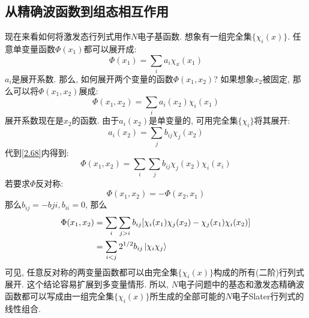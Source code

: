 \subsection{从精确波函数到组态相互作用}
 \label{sec2.2.7}
现在来看如何将激发态行列式用作$N$电子基函数. 想象有一组完全集$\{\chi_i(x)\}$. 任意单变量函数$\Phi(x_1)$都可以展开成:
\begin{equation}
	\Phi(x_1)=\sum_ia_i\chi_x(x_1)
\end{equation}
$a_i$是展开系数. 那么, 如何展开两个变量的函数$\Phi(x_1,x_2)$? 如果想象$x_2$被固定, 那么可以将$\Phi(x_1,x_2)$展成:
\begin{equation}
\label{2.68}
\Phi(x_1,x_2)=\sum_ia_i(x_2)\chi_i(x_1)
\end{equation}
展开系数现在是$x_2$的函数. 由于$a_i(x_2)$是单变量的, 可用完全集$\{\chi_i \}$将其展开:
\begin{equation}
a_i(x_2)=\sum_jb_{ij}\chi_j(x_2)
\end{equation}
代到\ref{2.68}内得到:
\begin{equation}
\Phi(x_1,x_2)=\sum_i\sum_jb_{ij}\chi_j(x_2)\chi_i(x_i)
\end{equation}
若要求$\Phi$反对称:
\begin{equation}
\Phi(x_1,x_2)=-\Phi(x_2,x_1)
\end{equation}
那么$b_{ij}=-b{ji},b_{ii}=0$, 那么
\begin{equation}
\begin{split}
\Phi(x_1,x_2)&=\sum_i\sum_{j>i}b_{ij}[\chi_i(x_1)\chi_j(x_2)-\chi_j(x_1)\chi_i(x_2)]\\
&=\sum_{i<j}2^{1/2}b_{ij}\Ket{\chi_i\chi_j}
\end{split}
\end{equation}
可见, 任意反对称的两变量函数都可以由完全集$\{\chi_i(x)\}$构成的所有(二阶)行列式展开. 这个结论容易扩展到多变量情形. 所以, $N$电子问题中的基态和激发态精确波函数都可以写成由一组完全集$\{\chi_i(x) \}$所生成的全部可能的$N$电子Slater行列式的线性组合.

